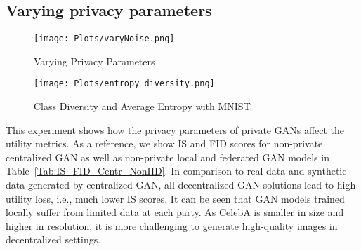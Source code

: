 \documentclass[conference]{IEEEtran}
\begin{document}

 
 
\subsection{Varying privacy parameters}

\begin{figure}[ht]
 \centering
 \texttt{[image: Plots/varyNoise.png]}
 \caption{Varying Privacy Parameters}
 \label{fig:varyNoise}
\end{figure}


\begin{figure}[t]
 \centering
 \texttt{[image: Plots/entropy\_diversity.png]}
	\caption{Class Diversity and Average Entropy with MNIST }
 \label{fig:varyNoiseDivEnt}
\end{figure}



 This experiment shows how the privacy parameters of private GANs affect the utility metrics.   {As a reference, we show IS and FID scores for non-private centralized GAN as well as non-private local and federated GAN models in Table~\ref{Tab:IS_FID_Centr_NonIID}}. In comparison to real data and synthetic data generated by centralized GAN, all decentralized GAN solutions lead to high utility loss, i.e., much lower IS scores.  It can be seen that GAN models trained locally suffer from limited data at each party. %
 As CelebA is smaller in size and higher in resolution, it is more challenging to generate high-quality images in decentralized settings. 
\end{document}
